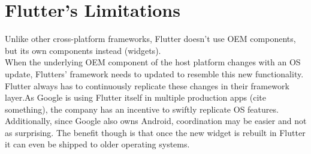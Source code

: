 \section{Flutter's Limitations}
Unlike other cross-platform frameworks, Flutter doesn't use OEM components, but its own components instead (widgets).\\
When the underlying OEM component of the host platform changes with an OS update, Flutters' framework needs to updated to resemble this new 
functionality. Flutter always has to continuously replicate these changes in their framework layer.As Google is using Flutter itself in multiple 
production apps (cite something), the company has an incentive to swiftly replicate OS features. Additionally, since Google also owns Android, 
coordination may be easier and not as surprising.
The benefit though is that once the new widget is rebuilt in Flutter it can even be shipped to older operating systems.